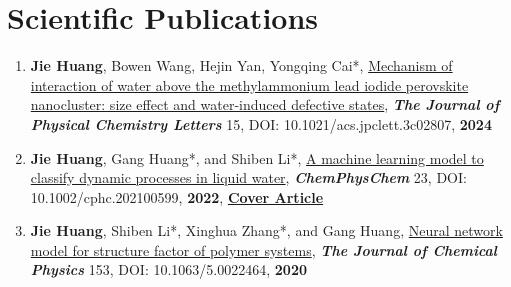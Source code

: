 \documentclass[a4paper,10pt]{article} %
\begin{document}
%	
%
\section{Scientific Publications}  

\begin{enumerate}
\item \textbf{Jie Huang}, Bowen Wang, Hejin Yan, Yongqing Cai*, \href{https://doi.org/10.1021/acs.jpclett.3c02807}{Mechanism of interaction of water above the methylammonium lead iodide perovskite nanocluster: size effect and water-induced defective states},   \textbf{\emph{The Journal of Physical Chemistry Letters}} 15, DOI: 10.1021/acs.jpclett.3c02807,  \textbf{2024}


\item \textbf{Jie Huang}, Gang Huang*, and Shiben Li*, \href{https://chemistry-europe.onlinelibrary.wiley.com/doi/abs/10.1002/cphc.202100599}{A machine learning model to classify dynamic processes in liquid water},   \textbf{\emph{ChemPhysChem}} 23, DOI: 10.1002/cphc.202100599,  \textbf{2022}, \href{https://cdn.jsdelivr.net/gh/HuangJiaLian/DataBase0@master/uPic/2022_01_05_16_CoverProfile.pdf}{\textbf{Cover Article}}


\item \textbf{Jie Huang}, Shiben Li*, Xinghua Zhang*, and Gang Huang, \href{https://aip.scitation.org/doi/10.1063/5.0022464}{Neural network model for structure factor of polymer systems},  \textbf{\emph{The Journal of Chemical Physics}} 153, DOI: 10.1063/5.0022464, \textbf{2020}
\end{enumerate}
\ 

\end{document}
